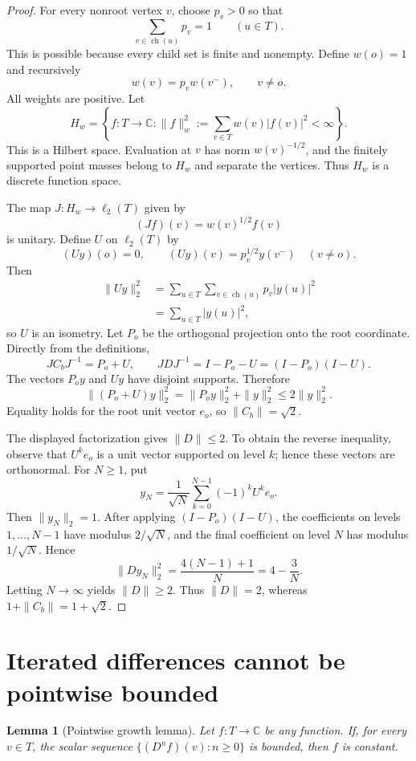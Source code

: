 \documentclass[11pt]{article}
\newtheorem{lemma}[theorem]{Lemma}
\newcommand{\Cb}{C_b}
\newcommand{\ch}{\operatorname{ch}}
\begin{document}
\begin{proof}
For every nonroot vertex $v$, choose $p_v>0$ so that
\[
  \sum_{v\in\ch(u)}p_v=1
  \qquad (u\in T).
\]
This is possible because every child set is finite and nonempty. Define
$w(o)=1$ and recursively
\[
  w(v)=p_vw(v^-),\qquad v\ne o.
\]
All weights are positive. Let
\[
  H_w=\left\{f:T\longrightarrow\mathbb C:
  \|f\|_w^2:=\sum_{v\in T}w(v)|f(v)|^2<\infty\right\}.
\]
This is a Hilbert space. Evaluation at $v$ has norm $w(v)^{-1/2}$, and the
finitely supported point masses belong to $H_w$ and separate the vertices.
Thus $H_w$ is a discrete function space.

The map $J:H_w\to\ell_2(T)$ given by
\[
  (Jf)(v)=w(v)^{1/2}f(v)
\]
is unitary. Define $U$ on $\ell_2(T)$ by
\[
  (Uy)(o)=0,\qquad (Uy)(v)=p_v^{1/2}y(v^-)\quad(v\ne o).
\]
Then
\[
\begin{aligned}
  \|Uy\|_2^2
  &=\sum_{u\in T}\sum_{v\in\ch(u)}p_v|y(u)|^2\\
  &=\sum_{u\in T}|y(u)|^2,
\end{aligned}
\]
so $U$ is an isometry. Let $P_o$ be the orthogonal projection onto the root
coordinate. Directly from the definitions,
\[
  J\Cb J^{-1}=P_o+U,
  \qquad JDJ^{-1}=I-P_o-U=(I-P_o)(I-U).
\]
The vectors $P_oy$ and $Uy$ have disjoint supports. Therefore
\[
  \|(P_o+U)y\|_2^2=\|P_oy\|_2^2+\|y\|_2^2
  \le 2\|y\|_2^2.
\]
Equality holds for the root unit vector $e_o$, so $\|\Cb\|=\sqrt2$.

The displayed factorization gives $\|D\|\le2$. To obtain the reverse
inequality, observe that $U^ke_o$ is a unit vector supported on level $k$;
hence these vectors are orthonormal. For $N\ge1$, put
\[
  y_N=\frac1{\sqrt N}\sum_{k=0}^{N-1}(-1)^kU^ke_o.
\]
Then $\|y_N\|_2=1$. After applying $(I-P_o)(I-U)$, the coefficients on
levels $1,\ldots,N-1$ have modulus $2/\sqrt N$, and the final coefficient on
level $N$ has modulus $1/\sqrt N$. Hence
\[
  \|Dy_N\|_2^2=\frac{4(N-1)+1}{N}=4-\frac3N.
\]
Letting $N\to\infty$ yields $\|D\|\ge2$. Thus $\|D\|=2$, whereas
$1+\|\Cb\|=1+\sqrt2$.
\end{proof}

\section{Iterated differences cannot be pointwise bounded}

\begin{lemma}[Pointwise growth lemma]\label{lem:growth}
Let $f:T\to\mathbb C$ be any function. If, for every $v\in T$, the scalar
sequence $\{(D^nf)(v):n\ge0\}$ is bounded, then $f$ is constant.
\end{lemma}
\end{document}
